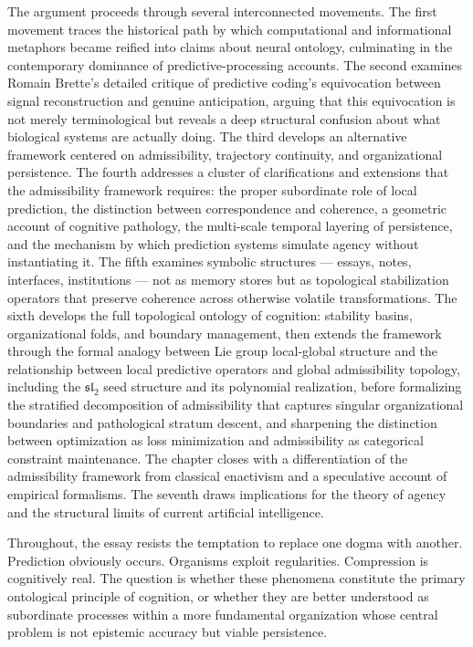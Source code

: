 \documentclass[12pt,a4paper]{report}
\theoremstyle{flyxion}
\begin{document}
The argument proceeds through several interconnected movements. The first movement traces the historical path by which computational and informational metaphors became reified into claims about neural ontology, culminating in the contemporary dominance of predictive-processing accounts. The second examines Romain Brette's detailed critique of predictive coding's equivocation between signal reconstruction and genuine anticipation, arguing that this equivocation is not merely terminological but reveals a deep structural confusion about what biological systems are actually doing. The third develops an alternative framework centered on admissibility, trajectory continuity, and organizational persistence. The fourth addresses a cluster of clarifications and extensions that the admissibility framework requires: the proper subordinate role of local prediction, the distinction between correspondence and coherence, a geometric account of cognitive pathology, the multi-scale temporal layering of persistence, and the mechanism by which prediction systems simulate agency without instantiating it. The fifth examines symbolic structures --- essays, notes, interfaces, institutions --- not as memory stores but as topological stabilization operators that preserve coherence across otherwise volatile transformations. The sixth develops the full topological ontology of cognition: stability basins, organizational folds, and boundary management, then extends the framework through the formal analogy between Lie group local-global structure and the relationship between local predictive operators and global admissibility topology, including the $\mathfrak{sl}_2$ seed structure and its polynomial realization, before formalizing the stratified decomposition of admissibility that captures singular organizational boundaries and pathological stratum descent, and sharpening the distinction between optimization as loss minimization and admissibility as categorical constraint maintenance. The chapter closes with a differentiation of the admissibility framework from classical enactivism and a speculative account of empirical formalisms. The seventh draws implications for the theory of agency and the structural limits of current artificial intelligence.

Throughout, the essay resists the temptation to replace one dogma with another. Prediction obviously occurs. Organisms exploit regularities. Compression is cognitively real. The question is whether these phenomena constitute the primary ontological principle of cognition, or whether they are better understood as subordinate processes within a more fundamental organization whose central problem is not epistemic accuracy but viable persistence.
\end{document}
